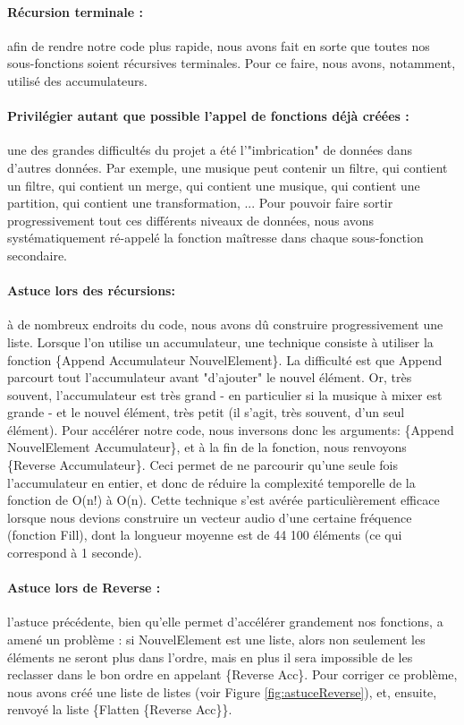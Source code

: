 \documentclass[10pt,a4paper]{article}
\begin{document}
\paragraph{Récursion terminale :} 
afin de rendre notre code plus rapide, nous avons fait en 
sorte que toutes nos sous-fonctions soient récursives terminales. Pour ce faire, nous avons, notamment, utilisé des accumulateurs.
 
\paragraph{Privilégier autant que possible l'appel de fonctions déjà créées :} 
une des grandes difficultés du projet a été 
l'"imbrication" de données dans d'autres données. Par exemple, une musique peut contenir un filtre, qui contient un filtre,
qui contient un merge, qui contient une musique, qui contient une partition, qui contient une transformation, ... 
Pour pouvoir faire sortir progressivement tout ces différents niveaux de données, nous avons systématiquement ré-appelé
la fonction maîtresse dans chaque sous-fonction secondaire.

\paragraph{Astuce lors des récursions:}
à de nombreux endroits du code, nous avons dû construire progressivement une liste. 
Lorsque l'on utilise un accumulateur, une technique  consiste à utiliser la fonction 
\{Append Accumulateur NouvelElement\}. La difficulté est que Append  parcourt tout 
l'accumulateur avant "d'ajouter" le nouvel élément. Or, très souvent, l'accumulateur 
est très grand - en particulier si la musique à mixer est grande - et le nouvel élément,
très petit (il s'agit, très souvent, d'un seul élément). Pour accélérer notre code, 
nous inversons donc les arguments: \{Append NouvelElement Accumulateur\}, et à la fin 
de la fonction, nous renvoyons \{Reverse Accumulateur\}. Ceci permet de ne parcourir 
qu'une seule fois l'accumulateur en entier, et donc de réduire la complexité temporelle
de la fonction de O(n!) à O(n). Cette technique s'est avérée particulièrement efficace
lorsque nous devions construire un vecteur audio d'une certaine fréquence (fonction Fill),
dont la longueur moyenne est de 44 100 éléments (ce qui correspond à 1 seconde).

\paragraph{Astuce lors de Reverse :} 
l'astuce précédente, bien qu'elle permet d'accélérer grandement nos fonctions, a amené un problème :
si NouvelElement est une liste, alors non seulement les éléments ne seront plus dans l'ordre,
mais en plus il sera impossible de les reclasser dans le bon ordre en appelant \{Reverse Acc\}. 
Pour corriger ce problème, nous avons  créé une liste de listes (voir Figure \ref{fig:astuceReverse}), 
et, ensuite, renvoyé la liste \{Flatten \{Reverse Acc\}\}.
\end{document}
